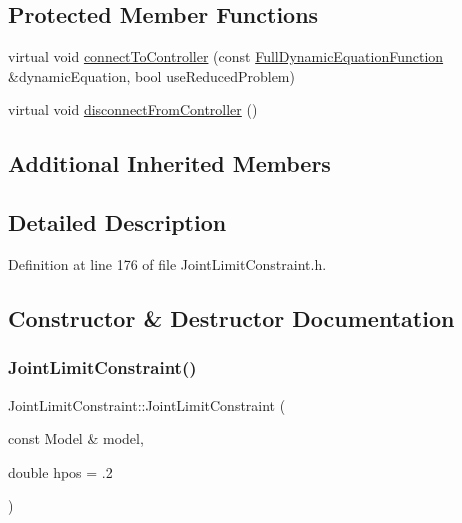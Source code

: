 \subsection*{Protected Member Functions}
\begin{DoxyCompactItemize}
\item 
virtual void \hyperlink{classocra_1_1JointLimitConstraint_a71cfd04e493f270e44b79fb5a46c1601}{connect\+To\+Controller} (const \hyperlink{classocra_1_1FullDynamicEquationFunction}{Full\+Dynamic\+Equation\+Function} \&dynamic\+Equation, bool use\+Reduced\+Problem)
\item 
virtual void \hyperlink{classocra_1_1JointLimitConstraint_a5f91d3b746f76f17f71a03b68de1f8ee}{disconnect\+From\+Controller} ()
\end{DoxyCompactItemize}
\subsection*{Additional Inherited Members}


\subsection{Detailed Description}


Definition at line 176 of file Joint\+Limit\+Constraint.\+h.



\subsection{Constructor \& Destructor Documentation}
\hypertarget{classocra_1_1JointLimitConstraint_af81ce81f8c90e5bf4272cc6ab592ae69}{}\label{classocra_1_1JointLimitConstraint_af81ce81f8c90e5bf4272cc6ab592ae69} 
\subsubsection{\texorpdfstring{Joint\+Limit\+Constraint()}{JointLimitConstraint()}\hspace{0.1cm}{\footnotesize\ttfamily [1/2]}}
{\footnotesize\ttfamily Joint\+Limit\+Constraint\+::\+Joint\+Limit\+Constraint (\begin{DoxyParamCaption}\item[{const Model \&}]{model,  }\item[{double}]{hpos = {\ttfamily .2} }\end{DoxyParamCaption})}



